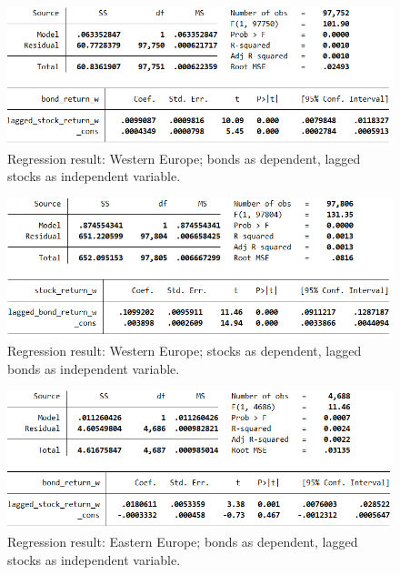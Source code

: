 \begin{figure}[H]
	\centering
	\includegraphics[width=1.0\linewidth]{figures/regression-results/regression-euw-bonds-as-dependent.PNG}
	\caption{Regression result: Western Europe; bonds as dependent, lagged stocks as independent variable. }
	\label{fig:regression-euw-bonds-as-dependent}
\end{figure}

\begin{figure}[H]
	\centering
	\includegraphics[width=1.0\linewidth]{figures/regression-results/regression-euw-stocks-as-dependent.PNG}
	\caption{Regression result: Western Europe; stocks as dependent, lagged bonds as independent variable. }
	\label{fig:regression-euw-stocks-as-dependent}
\end{figure}

\begin{figure}[H]
	\centering
	\includegraphics[width=1.0\linewidth]{figures/regression-results/regression-eue-bonds-as-dependent.PNG}
	\caption{Regression result: Eastern Europe; bonds as dependent, lagged stocks as independent variable. }
	\label{fig:regression-eue-bonds-as-dependent}
\end{figure}


